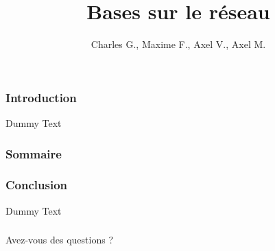 \documentclass{beamer}
\title{Bases sur le réseau}
\author{Charles G., Maxime F., Axel V., Axel M.}
\begin{document}
\begin{frame}\frametitle{}
    \maketitle
\end{frame}


\begin{frame}\frametitle{Introduction}
    Dummy Text
\end{frame}


\begin{frame}\frametitle{Sommaire}
    \tableofcontents
\end{frame}











\begin{frame}\frametitle{Conclusion}
    Dummy Text
\end{frame}


\begin{frame}\frametitle{}
    {\Huge Avez-vous des questions ?}
\end{frame}
\end{document}
